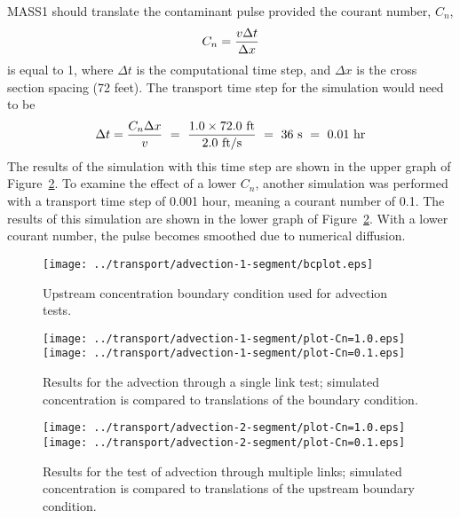 \documentclass[12pt,dvips,letterpaper]{article}
\begin{document}
MASS1 should translate the contaminant pulse provided the courant
number, $C_{n}$,
\begin{equation}
  \label{eq:courant-number}
  C_{n} = { { v \Delta t } \over { \Delta x } }
\end{equation}
is equal to 1, where $\Delta t$ is the computational time step, and
$\Delta x$ is the cross section spacing (72 feet). The transport time
step for the simulation would need to be
\[
\Delta t = { { C_{n} \Delta x } \over v } ~ = ~ {{ 1.0 \times 72.0 ~
    \mathrm{ft}} \over {2.0 ~ \mathrm{ft} \slash \mathrm{s} }} ~ = ~
    36 ~\mathrm{s} ~ = ~ 0.01 ~ \mathrm{hr}
\]
The results of the simulation with this time step are shown in the
upper graph of Figure~\ref{fig:test-advection-1-results}.  To examine
the effect of a lower $C_{n}$, another simulation was performed with a
transport time step of 0.001 hour, meaning a courant number of 0.1.
The results of this simulation are shown in the lower graph of
Figure~\ref{fig:test-advection-1-results}.  With a lower courant
number, the pulse becomes smoothed due to numerical diffusion.  

\begin{figure}[htbp]
  \begin{center}
    \texttt{[image: ../transport/advection-1-segment/bcplot.eps]}
    \caption{Upstream concentration boundary condition used for
      advection tests.} 
    \label{fig:test-advection-bc}
  \end{center}
\end{figure}

\begin{figure}[htbp]
  \begin{center}
    \texttt{[image: ../transport/advection-1-segment/plot-Cn=1.0.eps]}
    \texttt{[image: ../transport/advection-1-segment/plot-Cn=0.1.eps]}
    \caption{Results for the advection through a single link test;
      simulated concentration is compared to translations of the
      boundary condition.} 
    \label{fig:test-advection-1-results}
  \end{center}
\end{figure}

\begin{figure}[htbp]
  \begin{center}
    \texttt{[image: ../transport/advection-2-segment/plot-Cn=1.0.eps]}
    \texttt{[image: ../transport/advection-2-segment/plot-Cn=0.1.eps]}
    \caption{Results for the test of advection through multiple links;
      simulated concentration is compared to translations of the upstream
      boundary condition.}
    \label{fig:test-advection-2-results}
  \end{center}
\end{figure}
\end{document}
